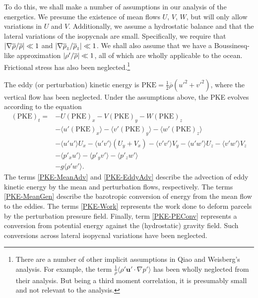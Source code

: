\documentclass[letterpaper, 11pt, onecolumn]{article}
\begin{document}
To do this, we shall make a number of assumptions in our analysis of the
energetics. We presume the existence of mean flows $U$, $V$, $W$, but will only
allow variations in $U$ and $V$. Additionally, we assume a hydrostatic balance
and that the lateral variations of the isopycnals are small. Specifically, we
require that $\lvert\nabla \overline{\rho} / \overline{\rho}\rvert \ll 1$ and
$\lvert\nabla \overline{\rho}_z / \overline{\rho}_z\rvert \ll 1$. We shall also
assume that we have a Boussinesq-like approximation
$\lvert\rho'/\overline{\rho}\rvert \ll 1$, all of which are wholly applicable to the
ocean. Frictional stress has also been neglected.\footnote{There are a number
of other implicit assumptions in Qiao and Weisberg's analysis. For example, the
term $\frac{1}{\overline{\rho}} \langle \rho' \bm{u}' \cdot \nabla p' \rangle$
has been wholly neglected from their analysis. But being a third moment
correlation, it is presumably small and not relevant to the analysis.}

The eddy (or perturbation) kinetic energy is $\text{PKE} = \frac{1}{2}
\overline{\rho} \left(u'^2 + v'^2\right)$, where the vertical flow has been
neglected. Under the assumptions above, the PKE evolves according to the
equation \begin{subequations}\label{PKE-eqn} \begin{align}
  \left(\text{PKE}\right)_t =& -U \left(\text{PKE}\right)_x -V
\left(\text{PKE}\right)_y -W \left(\text{PKE}\right)_z \label{PKE-MeanAdv}\\
  & - \langle u' \left(\text{PKE}\right)_x \rangle - \langle v'
\left(\text{PKE}\right)_y \rangle - \langle w' \left(\text{PKE}\right)_z
\rangle \label{PKE-EddyAdv} \\
  & - \langle u' u'\rangle U_x - \langle u' v' \rangle \left(U_y + V_x\right) -
\langle v' v' \rangle V_y - \langle u' w' \rangle U_z - \langle v' w' \rangle
V_z \label {PKE-MeanGen}\\
  & - \langle p'_x u' \rangle - \langle p'_y v' \rangle - \langle p'_z w'
\rangle \label{PKE-Work} \\
  & - g \langle \rho' w' \rangle \label{PKE-PEConv}. \end{align}
\end{subequations} The terms \eqref{PKE-MeanAdv} and \eqref{PKE-EddyAdv}
describe the advection of eddy kinetic energy by the mean and perturbation
flows, respectively. The terms \eqref{PKE-MeanGen} describe the barotropic
conversion of energy from the mean flow to the eddies. The terms
\eqref{PKE-Work} represents the work done to deform parcels by the perturbation
pressure field. Finally, term \eqref{PKE-PEConv} represents a conversion from
potential energy against the (hydrostatic) gravity field. Such conversions
across lateral isopycnal variations have been neglected.
\end{document}
